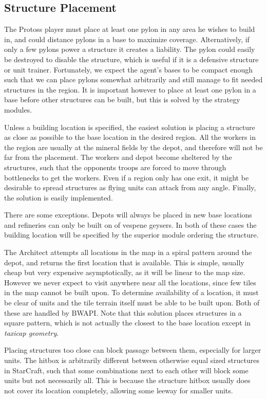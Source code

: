 	\subsection*{Structure Placement}
	The Protoss player must place at least one pylon in any area he wishes to build in, and could distance pylons in a base to maximize coverage. Alternatively, if only a few pylons power a structure it creates a liability. The pylon could easily be destroyed to disable the structure, which is useful if it is a defensive structure or unit trainer. Fortunately, we expect the agent's bases to be compact enough such that we can place pylons somewhat arbitrarily and still manage to fit needed structures in the region. It is important however to place at least one pylon in a base before other structures can be built, but this is solved by the strategy modules.
	
	Unless a building location is specified, the easiest solution is placing a structure as close as possible to the base location in the desired region. All the workers in the region are usually at the mineral fields by the depot, and therefore will not be far from the placement. The workers and depot become sheltered by the structures, such that the opponents troops are forced to move through bottlenecks to get the workers. Even if a region only has one exit, it might be desirable to spread structures as flying units can attack from any angle. Finally, the solution is easily implemented.
	
	There are some exceptions. Depots will always be placed in new base locations and refineries can only be built on of vespene geysers. In both of these cases the building location will be specified by the superior module ordering the structure.

	The Architect attempts all locations in the map in a spiral pattern around the depot, and returns the first location that is available. This is simple, usually cheap but very expensive asymptotically, as it will be linear to the map size. However we never expect to visit anywhere near all the locations, since few tiles in the map cannot be built upon. To determine availability of a location, it must be clear of units and the tile terrain itself must be able to be built upon. Both of these are handled by BWAPI. Note that this solution places structures in a square pattern, which is not actually the closest to the base location except in \emph{taxicap geometry}.

	Placing structures too close can block passage between them, especially for larger units. The hitbox is arbitrarily different between otherwise equal sized structures in StarCraft, such that some combinations next to each other will block some units but not necessarily all. This is because the structure hitbox usually does not cover its location completely, allowing some leeway for smaller units.
	
